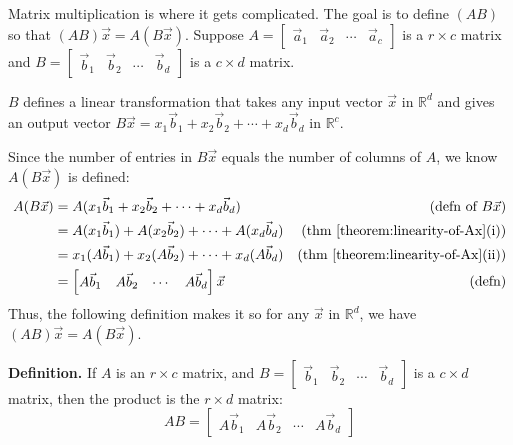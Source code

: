 \documentclass[11pt, letterpaper]{report}
\newenvironment{notes}{}{}
\newenvironment{book}{}{}
\newenvironment{definition}{\begin{bbox}\par\noindent\textbf{Definition. }}
  {\end{bbox}}
\newcounter{theorem}[chapter]
\newlength\oldfboxsep%
\newlength\myminiwidth%
\newenvironment{bbox}{%
  \setlength\oldfboxsep\fboxsep
  \setlength{\fboxsep}{.1in}%
  \setlength\myminiwidth\linewidth%
  \addtolength\myminiwidth{-0.2in}%
  \vspace{0.1in}%
  \begin{lrbox}{\bboxbox}\begin{minipage}{\myminiwidth}%
    }{%
    \end{minipage}\end{lrbox}%
  \noindent\fbox{\usebox{\bboxbox}}\vspace{0.1in}\setlength\fboxsep\oldfboxsep%
}
\newcommand{\R}{\mathbb{R}}
\begin{document}
\begin{book}
Matrix multiplication is where it gets complicated. The goal is to define $(AB)$ so that $(AB)\vec{x} = A(B\vec{x})$. Suppose $A =\begin{bmatrix}
\vec{a}_1 & \vec{a}_2 & \cdots & \vec{a}_c
\end{bmatrix}$ is a $r \times c$ matrix and $B =\begin{bmatrix}
\vec{b}_1 & \vec{b}_2 & \cdots & \vec{b}_{d}
\end{bmatrix}$ is a $c \times d$ matrix. 

$B$ defines a linear transformation that takes any input vector $\vec{x}$ in $\R^{d}$ and gives an output vector $B\vec{x} = x_1\vec{b}_1 + x_2\vec{b}_2+\cdots+x_d\vec{b}_d$ in $\R^{c}$.

Since the number of entries in $B\vec{x}$ equals the number of columns of $A$, we know $A(B\vec{x})$ is defined:
\begin{align*}
A(B\vec{x}) &= A(x_1\vec{b}_1 + x_2\vec{b}_2+\cdots+x_d\vec{b}_d) &(\text{defn of } B\vec{x}) \\
&= A(x_1\vec{b}_1) + A(x_2\vec{b}_2)+\cdots+A(x_d\vec{b}_d) &(\text{thm \ref{theorem:linearity-of-Ax}(i)}) \\
&=  x_1(A\vec{b}_1) + x_2(A\vec{b}_2)+\cdots+x_d(A\vec{b}_d) &(\text{thm \ref{theorem:linearity-of-Ax}(ii)}) \\
&=\begin{bmatrix}
A\vec{b}_1 & A\vec{b}_2 & \cdots & A\vec{b}_d
\end{bmatrix}\vec{x}
&(\text{defn})
\end{align*}
Thus, the following definition makes it so for any $\vec{x}$ in $\R^d$, we have $(AB)\vec{x} = A(B\vec{x})$.
\end{book}

\begin{definition} 
If $A$ is an $r \times c$ matrix, and $B = \begin{bmatrix}
\vec{b}_1 & \vec{b}_2 & \cdots & \vec{b}_{d}
\end{bmatrix}$ is a $c \times d$ matrix, then the product is the $r \times d$ matrix:
\[ AB  = \begin{bmatrix}
A\vec{b}_1 & A\vec{b}_2 & \cdots & A\vec{b}_{d}
\end{bmatrix}\]
\end{definition}

\begin{notes}
\newpage
\end{notes}
\end{document}

